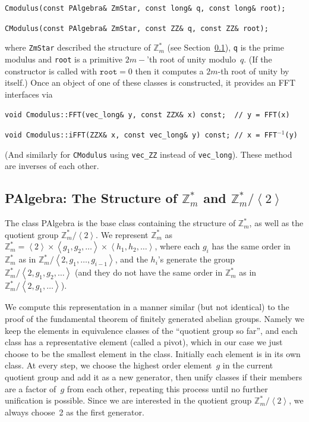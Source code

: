 \documentclass[14pt]{extarticle}
\newcommand{\secref}[1]{Section~\protect\ref{sec:#1}}
\newcommand{\Z}{\mathbb{Z}}
\newcommand{\grp}[1]{\left\langle #1 \right\rangle}
\def\PAlgebra{\textsf{PAlgebra}}
\begin{document}
\smallskip
\texttt{Cmodulus(const PAlgebra\& ZmStar, const long\& q, const long\& root);}

\texttt{CModulus(const PAlgebra\& ZmStar, const ZZ\& q, const ZZ\& root);}

\smallskip\noindent
where \texttt{ZmStar} described the structure of $\Z_m^*$ (see
\secref{PAlgebra}), \texttt{q} is the prime modulus and \texttt{root}
is a primitive $2m-$'th root of unity modulo~$q$. (If the constructor
is called with $\mathtt{root}=0$ then it computes a $2m$-th root of
unity by itself.) Once an object of one of these classes is
constructed, it provides an FFT interfaces via

\smallskip
\texttt{void Cmodulus::FFT(vec\_long\& y, const ZZX\& x) const;~ // y = FFT(x)}

\texttt{void Cmodulus::iFFT(ZZX\& x, const vec\_long\& y) const; // x = FFT$^{-1}$(y)}

\smallskip\noindent
(And similarly for \texttt{CModulus} using \texttt{vec\_ZZ} instead of
\texttt{vec\_long}). These method are inverses of each other. 

\subsection{{\PAlgebra}: The Structure of $\Z_m^*$ and $\Z_m^*/\grp{2}$}
\label{sec:PAlgebra}
The class {\PAlgebra} is the base class containing the structure
of $\Z_m^*$, as well as the quotient group $\Z_m^*/\grp{2}$. We
represent $\Z_m^*$ as $\Z_m^*= \grp{2} \times \grp{g_1,g_2,\ldots}
\times\grp{h_1,h_2,\ldots}$, where each $g_i$ has the same order
in $\Z_m^*$ as in $\Z_m^*/\grp{2,g_1,\ldots,g_{i-1}}$, and the
$h_i$'s generate the group $\Z_m^*/\grp{2,g_1,g_2,\ldots}$ (and they do
not have the same order in $\Z_m^*$ as in $\Z_m^*/\grp{2,g_1,\ldots}$).

We compute this representation in a manner similar (but not identical)
to the proof of the fundamental theorem of finitely generated abelian
groups. Namely we keep the elements in equivalence classes of the
``quotient group so far'', and each class has a representative element
(called a pivot), which in our case we just choose to be the smallest
element in the class. Initially each element is in its own class.
At every step, we choose the highest order element~$g$ in the current
quotient group and add it as a new generator, then unify classes if
their members are a factor of~$g$ from each other, repeating this
process until no further unification is possible.
Since we are interested in the quotient group $\Z_m^*/\grp{2}$, we
always choose~2 as the first generator.
\end{document}
